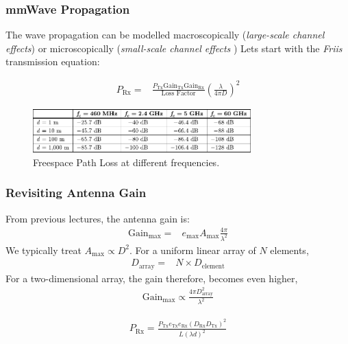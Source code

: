 \documentclass[10pt]{beamer}
\begin{document}
\begin{frame}
    \frametitle{mmWave Propagation}

    \begin{outline}
        \1 The wave propagation can be modelled macroscopically (\textit{large-scale channel effects}) or microscopically (\textit{small-scale channel effects}
        )
        \1 Lets start with the \textit{Friis} transmission equation:
    \end{outline}

    \begin{align*}
        P_{\text{Rx}} {}= & \frac{P_{\text{Tx}} \mathrm{Gain}_{\text{Tx}}  \mathrm{Gain}_{\text{Rx}}}{\text{Loss Factor}} \left(\frac{\lambda}{4 \pi D}\right)^2
    \end{align*}

    \begin{figure}[h!]
        \centering
        \includegraphics[width=0.75\textwidth]{table.pdf}
        \caption{Freespace Path Loss at different frequencies.}
    \end{figure}

\end{frame}



\begin{frame}
    \frametitle{Revisiting Antenna Gain}

    From previous lectures, the antenna gain is:
    \begin{align*}
        \mathrm{Gain}_{\max} {}= & e_{\max} A_{\max} \frac{4 \pi}{\lambda^{2}}
    \end{align*}
    We typically treat $A_{\max} \propto D^2$.    For a uniform linear array of $N$ elements,
    \begin{align*}
        D_{\text{array}} {}= & N \times D_{\text{element}}
    \end{align*}
    For a two-dimensional array, the gain therefore, becomes even higher,
    \begin{align*}
        \mathrm{Gain}_{\max} \propto \frac{4 \pi D_{\text{array}}^{2}}{\lambda^{2}}
    \end{align*}
    \begin{tcolorbox}[colback=blue!5]
        \begin{align*}
            P_{\text{Rx}}=\frac{P_{\text{Tx}} e_{\text{Tx}} e_{\text{Rx}}\left(D_{\text{Rx}} D_{\text{Tx}}\right)^{2}}{L(\lambda d)^{2}}
        \end{align*}
    \end{tcolorbox}
\end{frame}
\end{document}
